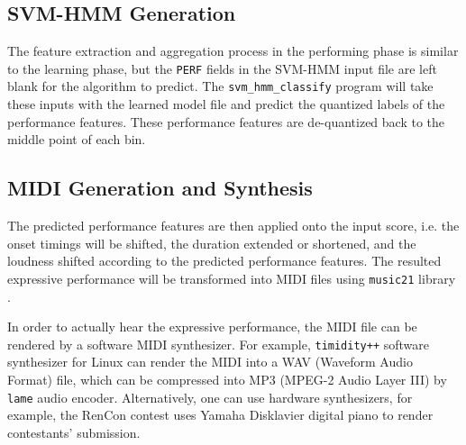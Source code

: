 \subsection{SVM-HMM Generation}
The feature extraction and aggregation process in the performing phase is similar to the learning phase, but the \texttt{PERF} fields in the SVM-HMM input file are left blank for the algorithm to predict. The \texttt{svm\_hmm\_classify} program will take these inputs with the learned model file and predict the quantized labels of the performance features. These performance features are de-quantized back to the middle point of each bin. 

      
\subsection{MIDI Generation and Synthesis}

The predicted performance features are then applied onto the input score, i.e. the onset timings will be shifted, the duration extended or shortened, and the loudness shifted according to the predicted performance features. The resulted expressive performance will be transformed into MIDI files using \texttt{music21} library \cite{music21}.%

In order to actually hear the expressive performance, the MIDI file can be rendered by a software MIDI synthesizer. %
For example, \texttt{timidity++} software synthesizer for Linux can render the MIDI into a WAV (Waveform Audio Format) file, which can be compressed into MP3 (MPEG-2 Audio Layer III) by \texttt{lame} audio encoder. Alternatively, one can use hardware synthesizers, for example, the RenCon \cite{RenCon} contest uses Yamaha Disklavier digital piano to render contestants' submission.

